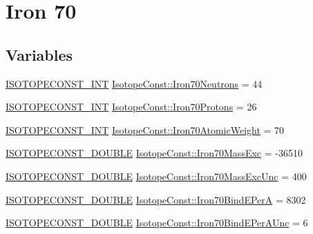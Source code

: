 \hypertarget{group___isotope_const-_iron-_fe70}{}\section{Iron 70}
\label{group___isotope_const-_iron-_fe70}
\subsection*{Variables}
\begin{DoxyCompactItemize}
\item 
\mbox{\hyperlink{group___isotope_const-_macros_ga5f18360b3e99483a35c32d789e62621c}{I\+S\+O\+T\+O\+P\+E\+C\+O\+N\+S\+T\+\_\+\+I\+NT}} \mbox{\hyperlink{group___isotope_const-_iron-_fe70_gad5fed6e4b6dc92ebc0e7bd184d0d9c0e}{Isotope\+Const\+::\+Iron70\+Neutrons}} = 44
\item 
\mbox{\hyperlink{group___isotope_const-_macros_ga5f18360b3e99483a35c32d789e62621c}{I\+S\+O\+T\+O\+P\+E\+C\+O\+N\+S\+T\+\_\+\+I\+NT}} \mbox{\hyperlink{group___isotope_const-_iron-_fe70_ga98f8f47bb98bd1560e8af88884fcea10}{Isotope\+Const\+::\+Iron70\+Protons}} = 26
\item 
\mbox{\hyperlink{group___isotope_const-_macros_ga5f18360b3e99483a35c32d789e62621c}{I\+S\+O\+T\+O\+P\+E\+C\+O\+N\+S\+T\+\_\+\+I\+NT}} \mbox{\hyperlink{group___isotope_const-_iron-_fe70_ga22c039acf1f59f51a91888324be638de}{Isotope\+Const\+::\+Iron70\+Atomic\+Weight}} = 70
\item 
\mbox{\hyperlink{group___isotope_const-_macros_ga8f45a7272ce02c0b4c65c44636ed719a}{I\+S\+O\+T\+O\+P\+E\+C\+O\+N\+S\+T\+\_\+\+D\+O\+U\+B\+LE}} \mbox{\hyperlink{group___isotope_const-_iron-_fe70_ga1e0a7b68f9030d7b27f6937cb492d42a}{Isotope\+Const\+::\+Iron70\+Mass\+Exc}} = -\/36510
\item 
\mbox{\hyperlink{group___isotope_const-_macros_ga8f45a7272ce02c0b4c65c44636ed719a}{I\+S\+O\+T\+O\+P\+E\+C\+O\+N\+S\+T\+\_\+\+D\+O\+U\+B\+LE}} \mbox{\hyperlink{group___isotope_const-_iron-_fe70_ga01908f7d177548c32ec7f9317399ba1e}{Isotope\+Const\+::\+Iron70\+Mass\+Exc\+Unc}} = 400
\item 
\mbox{\hyperlink{group___isotope_const-_macros_ga8f45a7272ce02c0b4c65c44636ed719a}{I\+S\+O\+T\+O\+P\+E\+C\+O\+N\+S\+T\+\_\+\+D\+O\+U\+B\+LE}} \mbox{\hyperlink{group___isotope_const-_iron-_fe70_ga99aef27b1fc50687c4eff5a9c9ff33a4}{Isotope\+Const\+::\+Iron70\+Bind\+E\+PerA}} = 8302
\item 
\mbox{\hyperlink{group___isotope_const-_macros_ga8f45a7272ce02c0b4c65c44636ed719a}{I\+S\+O\+T\+O\+P\+E\+C\+O\+N\+S\+T\+\_\+\+D\+O\+U\+B\+LE}} \mbox{\hyperlink{group___isotope_const-_iron-_fe70_gaad0556a54254e959076c48faf182c096}{Isotope\+Const\+::\+Iron70\+Bind\+E\+Per\+A\+Unc}} = 6

\end{DoxyCompactItemize}
